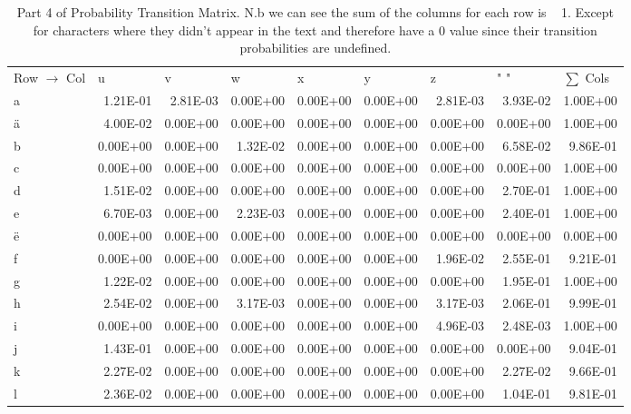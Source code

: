 \documentclass[11pt,a4paper]{CLabBookTemplate} %
\begin{document}
\begin{table}[htbp]
	\centering
	\caption{Part 4 of Probability Transition Matrix. N.b we can see the sum of the columns for each row is ~ 1. Except for characters where they didn't appear in the text and therefore have a 0 value since their transition probabilities are undefined.}
	\begin{tabular}{lrrrrrrrr}
		Row $\rightarrow$ Col & \multicolumn{1}{l}{u} & \multicolumn{1}{l}{v} & \multicolumn{1}{l}{w} & \multicolumn{1}{l}{x} & \multicolumn{1}{l}{y} & \multicolumn{1}{l}{z} & \multicolumn{1}{l}{" "} & \multicolumn{1}{l}{$\sum$ Cols} \\
		a     & 1.21E-01 & 2.81E-03 & 0.00E+00 & 0.00E+00 & 0.00E+00 & 2.81E-03 & 3.93E-02 & 1.00E+00 \\
		ä     & 4.00E-02 & 0.00E+00 & 0.00E+00 & 0.00E+00 & 0.00E+00 & 0.00E+00 & 0.00E+00 & 1.00E+00 \\
		b     & 0.00E+00 & 0.00E+00 & 1.32E-02 & 0.00E+00 & 0.00E+00 & 0.00E+00 & 6.58E-02 & 9.86E-01 \\
		c     & 0.00E+00 & 0.00E+00 & 0.00E+00 & 0.00E+00 & 0.00E+00 & 0.00E+00 & 0.00E+00 & 1.00E+00 \\
		d     & 1.51E-02 & 0.00E+00 & 0.00E+00 & 0.00E+00 & 0.00E+00 & 0.00E+00 & 2.70E-01 & 1.00E+00 \\
		e     & 6.70E-03 & 0.00E+00 & 2.23E-03 & 0.00E+00 & 0.00E+00 & 0.00E+00 & 2.40E-01 & 1.00E+00 \\
		ë     & 0.00E+00 & 0.00E+00 & 0.00E+00 & 0.00E+00 & 0.00E+00 & 0.00E+00 & 0.00E+00 & 0.00E+00 \\
		f     & 0.00E+00 & 0.00E+00 & 0.00E+00 & 0.00E+00 & 0.00E+00 & 1.96E-02 & 2.55E-01 & 9.21E-01 \\
		g     & 1.22E-02 & 0.00E+00 & 0.00E+00 & 0.00E+00 & 0.00E+00 & 0.00E+00 & 1.95E-01 & 1.00E+00 \\
		h     & 2.54E-02 & 0.00E+00 & 3.17E-03 & 0.00E+00 & 0.00E+00 & 3.17E-03 & 2.06E-01 & 9.99E-01 \\
		i     & 0.00E+00 & 0.00E+00 & 0.00E+00 & 0.00E+00 & 0.00E+00 & 4.96E-03 & 2.48E-03 & 1.00E+00 \\
		j     & 1.43E-01 & 0.00E+00 & 0.00E+00 & 0.00E+00 & 0.00E+00 & 0.00E+00 & 0.00E+00 & 9.04E-01 \\
		k     & 2.27E-02 & 0.00E+00 & 0.00E+00 & 0.00E+00 & 0.00E+00 & 0.00E+00 & 2.27E-02 & 9.66E-01 \\
		l     & 2.36E-02 & 0.00E+00 & 0.00E+00 & 0.00E+00 & 0.00E+00 & 0.00E+00 & 1.04E-01 & 9.81E-01 \\

\end{tabular}
\end{table}
\end{document}
